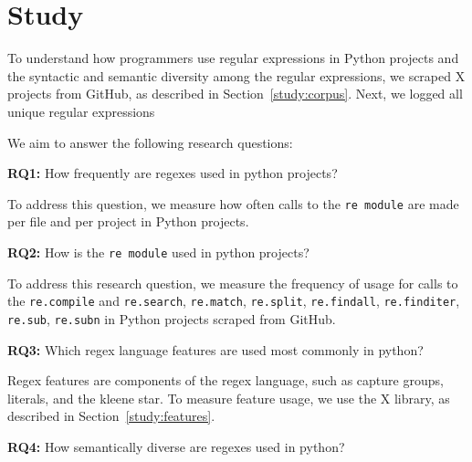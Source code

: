 \section{Study}


To understand how programmers use regular expressions in Python projects and the syntactic and semantic diversity among the regular expressions, we scraped X projects from GitHub, as described in Section~\ref{study:corpus}. Next, we logged all unique regular expressions 

We aim to answer the following research questions:

\textbf{RQ1:} How frequently are regexes used in python projects?

To address this question, we measure how often  calls to the {\tt re module} are made per file and per project in Python projects. 


\textbf{RQ2:} How is the {\tt re module} used in python projects?

To address this research question, we measure the frequency of usage for calls to the {\tt re.compile} and {\tt re.search}, {\tt re.match}, {\tt re.split}, {\tt re.findall}, {\tt re.finditer}, {\tt re.sub}, {\tt re.subn} in Python projects scraped from GitHub. 


\textbf{RQ3:} Which regex language features are used most commonly in python?

Regex features are components of the regex language, such as capture groups, literals, and the kleene star. To measure feature usage, we use the X library, as described in Section~\ref{study:features}. 

\textbf{RQ4:} How semantically diverse are regexes used in python?


